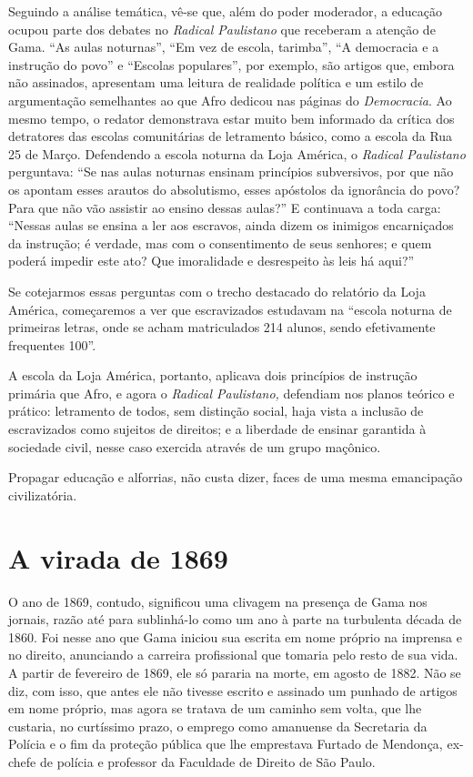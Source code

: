 Seguindo a análise temática, vê-se que, além do poder moderador, a
educação ocupou parte dos debates no \emph{Radical Paulistano} que
receberam a atenção de Gama. ``As aulas noturnas'', ``Em vez de
escola, tarimba'', ``A democracia e a instrução do povo'' e ``Escolas
populares'', por exemplo, são artigos que, embora não assinados,
apresentam uma leitura de realidade política e um estilo de argumentação
semelhantes ao que Afro dedicou nas páginas do \emph{Democracia}.
Ao mesmo tempo, o redator demonstrava estar muito bem informado da
crítica dos detratores das escolas comunitárias de letramento básico,
como a escola da Rua 25 de Março. Defendendo a escola noturna da Loja
América, o \emph{Radical Paulistano} perguntava: ``Se nas aulas noturnas
ensinam princípios subversivos, por que não os apontam esses arautos do
absolutismo, esses apóstolos da ignorância do povo? Para que não vão
assistir ao ensino dessas aulas?'' E continuava a toda carga: ``Nessas
aulas se ensina a ler aos escravos, ainda dizem os inimigos encarniçados
da instrução; é verdade, mas com o consentimento de seus senhores; e
quem poderá impedir este ato? Que imoralidade e desrespeito às leis há
aqui?''

Se cotejarmos essas perguntas com o trecho destacado do relatório da
Loja América, começaremos a ver que escravizados estudavam na ``escola
noturna de primeiras letras, onde se acham matriculados 214 alunos,
sendo efetivamente frequentes 100''.

A escola da Loja América, portanto, aplicava dois princípios de
instrução primária que Afro, e agora o \emph{Radical Paulistano,}
defendiam nos planos teórico e prático: letramento de todos, sem
distinção social, haja vista a inclusão de escravizados como sujeitos de
direitos; e a liberdade de ensinar garantida à sociedade civil, nesse
caso exercida através de um grupo maçônico.

Propagar educação e alforrias, não custa dizer, faces de uma mesma
emancipação civilizatória.

\section{A virada de 1869}

O ano de 1869, contudo, significou uma clivagem na presença de Gama nos
jornais, razão até para sublinhá-lo como um ano à parte na turbulenta
década de 1860. Foi nesse ano que Gama iniciou sua escrita em nome
próprio na imprensa e no direito, anunciando a carreira profissional que
tomaria pelo resto de sua vida. A partir de fevereiro de 1869, ele só
pararia na morte, em agosto de 1882. Não se diz, com isso, que antes ele
não tivesse escrito e assinado um punhado de artigos em nome próprio,
mas agora se tratava de um caminho sem volta, que lhe custaria, no
curtíssimo prazo, o emprego como amanuense da Secretaria da Polícia e o
fim da proteção pública que lhe emprestava Furtado de Mendonça, ex-chefe
de polícia e professor da Faculdade de Direito de São Paulo.

